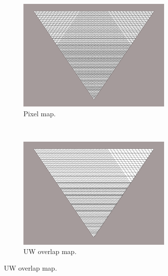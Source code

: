 \begin{figure}[h]
  \centering
  \begin{subfigure}[b]{0.45\textwidth}
  \includegraphics[width= 3in, keepaspectratio = true]{PCAL_pixel_screenshot}
  \caption{Pixel map.}
  \end{subfigure}
  ~
  \begin{subfigure}[b]{0.45\textwidth}
  \includegraphics[width= 3in, keepaspectratio = true]{PCAL_UW_screenshot}
  \caption{UW overlap map.}
  \end{subfigure}


\end{figure}
